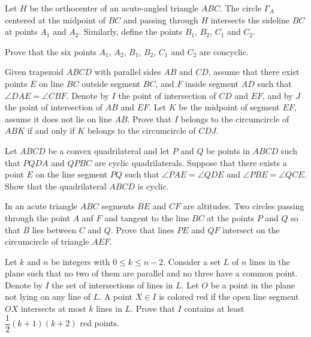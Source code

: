 \item[\textbf{G1.}]
Let 
$ H$
 be the orthocenter of an acute-angled triangle 
$ ABC$.
 The circle 
$ \Gamma_{A}$
 centered at the midpoint of 
$ BC$
 and passing through 
$ H$
 intersects the sideline 
$ BC$
 at points  
$ A_{1}$
 and 
$ A_{2}$.
 Similarly, define the points 
$ B_{1}$, 
$ B_{2}$, 
$ C_{1}$
 and 
$ C_{2}$.


Prove that the six points 
$ A_{1}$, 
$ A_{2}$, 
$ B_{1}$, 
$ B_{2}$, 
$ C_{1}$
 and 
$ C_{2}$
 are concyclic.

\item[\textbf{G2.}]
Given trapezoid 
$ ABCD$
 with parallel sides 
$ AB$
 and 
$ CD$, 
 assume that there exist points 
$ E$
 on line 
$ BC$
 outside segment 
$ BC$, 
 and 
$ F$
 inside segment 
$ AD$
 such that 
$ \angle DAE = \angle CBF$.
 Denote by 
$ I$
 the point of intersection of 
$ CD$
 and 
$ EF$, 
 and by 
$ J$
 the point of intersection of 
$ AB$
 and 
$ EF$.
 Let 
$ K$
 be the midpoint of segment 
$ EF$, 
 assume it does not lie on line 
$ AB$.
 Prove that 
$ I$
 belongs to the circumcircle of 
$ ABK$
 if and only if 
$ K$
 belongs to the circumcircle of 
$ CDJ$.

\item[\textbf{G3.}]
Let 
$ ABCD$
 be a convex quadrilateral and let 
$ P$
 and 
$ Q$
 be points in 
$ ABCD$
 such that 
$ PQDA$
 and 
$ QPBC$
 are cyclic quadrilaterals. Suppose that there exists a point 
$ E$
 on the line segment 
$ PQ$
 such that 
$ \angle PAE = \angle QDE$
 and 
$ \angle PBE = \angle QCE$.
 Show that the quadrilateral 
$ ABCD$
 is cyclic.

\item[\textbf{G4.}]
In an acute triangle 
$ ABC$
 segments 
$ BE$
 and 
$ CF$
 are altitudes. Two circles passing through the point 
$ A$
 anf 
$ F$
 and tangent to the line 
$ BC$
 at the points 
$ P$
 and 
$ Q$
 so that 
$ B$
 lies between 
$ C$
 and 
$ Q$.
 Prove that lines 
$ PE$
 and 
$ QF$
 intersect on the circumcircle of triangle 
$ AEF$.

\item[\textbf{G5.}]
Let 
$ k$
 and 
$ n$
 be integers with 
$ 0\le k\le n - 2$.
 Consider a set 
$ L$
 of 
$ n$
 lines in the plane such that no two of them are parallel and no three have a common point. Denote by 
$ I$
 the set of intersections of lines in 
$ L$.
 Let 
$ O$
 be a point in the plane not lying on any line of 
$ L$.
 A point 
$ X\in I$
 is colored red if the open line segment 
$ OX$
 intersects at most 
$ k$
 lines in 
$ L$.
 Prove that 
$ I$
 contains at least 
$ \dfrac{1}{2}(k + 1)(k + 2)$
 red points.


